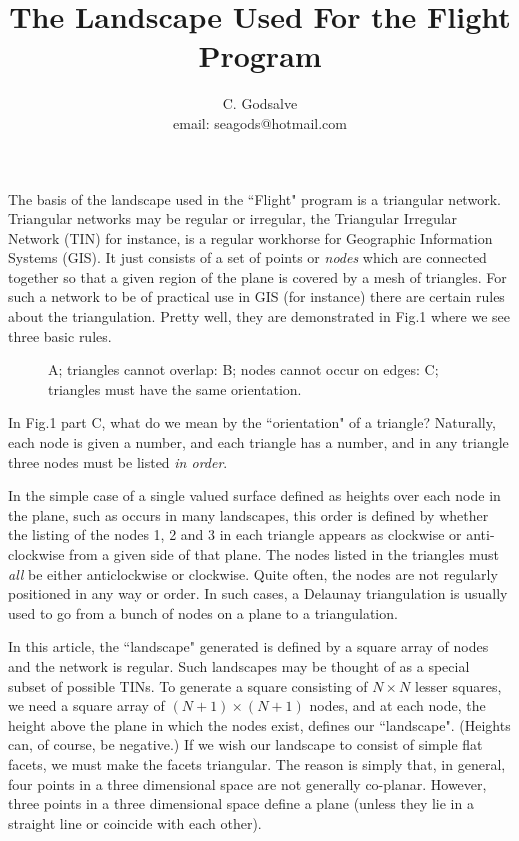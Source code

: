 \documentclass[12pt]{article}
\begin{document}
\thispagestyle{empty}




\title{The Landscape Used For the  Flight Program}

\author{C. Godsalve \\
   email: seagods@hotmail.com}

\maketitle

The basis of the landscape used in the ``Flight" program is a triangular network.
Triangular networks may be regular or irregular, the Triangular Irregular Network (TIN) for instance,
 is a regular workhorse for Geographic 
 Information Systems (GIS)\cite{GIS:Mybib}. It just consists of a set of points or {\it nodes}
which are connected together so that a given region of the plane is covered by a mesh of
triangles. For such a network to be of practical use in GIS (for instance) there
are certain rules about the triangulation. Pretty well,  they are demonstrated
in Fig.1 where we see three basic rules.
\begin{figure}[htb]
\vspace*{10cm}
\caption{ A; triangles cannot overlap: B; nodes cannot occur on edges: C; triangles must have the same orientation.}
\end{figure}
In Fig.1 part C, what do we mean by  the ``orientation" of a triangle? 
Naturally, each node is given a number, and each triangle has a number, and in 
any triangle three nodes must be listed {\it in order}. 

In the simple case of
a single valued surface defined as heights over each node in the plane, such as occurs in many landscapes,
 this order is defined by whether
the listing of the nodes 1, 2 and 3 in each triangle  appears as clockwise or anti-clockwise from a given side
of that plane.
The nodes listed in the triangles must {\it all} be either 
anticlockwise or clockwise. 
Quite often, the nodes are not regularly positioned in any way or order. 
In such cases, a {Delaunay triangulation}\cite{Delaunay:Mybib} is usually used to go from
 a bunch of nodes on a plane to a triangulation. 

In this article, the ``landscape" generated is defined by a square array of nodes
and the network is regular. Such landscapes may be thought of as a special subset of
possible TINs.
To generate a square consisting of $N\times N$ lesser squares, we need a
square array of $(N+1)\times(N+1)$ nodes, and at each node, the  height above the
plane in which the nodes exist, defines our ``landscape". (Heights can, of course, be negative.) 
If we wish our landscape to consist of simple flat facets, we 
must make the facets triangular. The reason is simply that, in general, four points in a three dimensional space
 are not generally co-planar. However, three
points in a three dimensional space define a plane (unless they lie in a straight line or coincide with each other).
\end{document}
